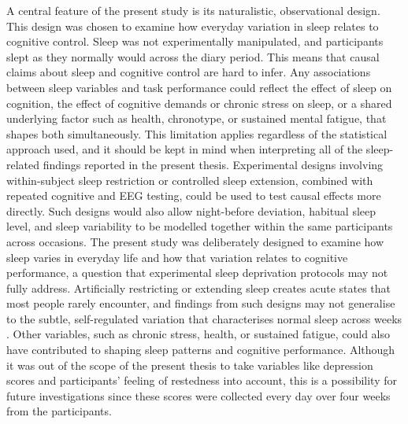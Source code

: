 \documentclass[12pt,a4paper]{report}
\begin{document}
A central feature of the present study is its naturalistic, observational design. This design was chosen to examine how everyday variation in sleep relates to cognitive control. Sleep was not experimentally manipulated, and participants slept as they normally would across the diary period. This means that causal claims about sleep and cognitive control are hard to infer. Any associations between sleep variables and task performance could reflect the effect of sleep on cognition, the effect of cognitive demands or chronic stress on sleep, or a shared underlying factor such as health, chronotype, or sustained mental fatigue, that shapes both simultaneously. This limitation applies regardless of the statistical approach used, and it should be kept in mind when interpreting all of the sleep-related findings reported in the present thesis. Experimental designs involving within-subject sleep restriction or controlled sleep extension, combined with repeated cognitive and EEG testing, could be used to test causal effects more directly. Such designs would also allow night-before deviation, habitual sleep level, and sleep variability to be modelled together within the same participants across occasions. The present study was deliberately designed to examine how sleep varies in everyday life and how that variation relates to cognitive performance, a question that experimental sleep deprivation protocols may not fully address. Artificially restricting or extending sleep creates acute states that most people rarely encounter, and findings from such designs may not generalise to the subtle, self-regulated variation that characterises normal sleep across weeks \parencite{fjell2024sleep}. Other variables, such as chronic stress, health, or sustained fatigue, could also have contributed to shaping sleep patterns and cognitive performance. Although it was out of the scope of the present thesis to take variables like depression scores and participants' feeling of restedness into account, this is a possibility for future investigations since these scores were collected every day over four weeks from the participants. 
\end{document}
